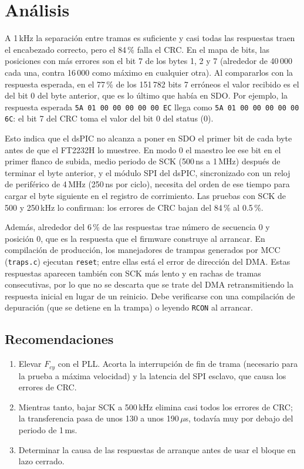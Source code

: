 \section{Análisis}

A 1\,kHz la separación entre tramas es suficiente y casi todas las respuestas
traen el encabezado correcto, pero el 84\,\% falla el CRC. En el mapa de
bits, las posiciones con más errores son el bit 7 de los bytes 1, 2 y 7
(alrededor de 40\,000 cada una, contra 16\,000 como máximo en cualquier otra). Al compararlos con la respuesta esperada, en el 77\,\% de los
151\,782 bits 7 erróneos el valor recibido es el del bit 0 del byte anterior,
que es lo último que había en SDO. Por ejemplo, la respuesta
esperada \texttt{5A 01 00 00 00 00 00 EC} llega como
\texttt{5A 01 00 00 00 00 00 6C}: el bit 7 del CRC toma el valor del bit 0
del status (0).

Esto indica que el dsPIC no alcanza a poner en SDO el primer bit de cada
byte antes de que el FT2232H lo muestree. En modo 0 el maestro lee ese bit
en el primer flanco de subida, medio periodo de SCK (500\,ns a 1\,MHz)
después de terminar el byte anterior, y el módulo SPI del dsPIC, sincronizado
con un reloj de periférico de 4\,MHz (250\,ns por ciclo), necesita del orden
de ese tiempo para cargar el byte siguiente en el registro de corrimiento.
Las pruebas con SCK de 500 y 250\,kHz lo confirman: los errores de CRC bajan
del 84\,\% al 0.5\,\%.

Además, alrededor del 6\,\% de las respuestas trae número de secuencia 0 y
posición 0, que es la respuesta que el firmware construye al arrancar. En
compilación de producción, los manejadores de trampas generados por MCC
(\texttt{traps.c}) ejecutan \texttt{reset}; entre ellas está el error de
dirección del DMA. Estas respuestas aparecen también con SCK más lento y en
rachas de tramas consecutivas, por lo que no se descarta que se trate del DMA
retransmitiendo la respuesta inicial en lugar de un reinicio. Debe
verificarse con una compilación de depuración (que se detiene en la trampa) o
leyendo \texttt{RCON} al arrancar.

\subsection*{Recomendaciones}

\begin{enumerate}
\item Elevar $F_{cy}$ con el PLL. Acorta la interrupción de fin de trama
  (necesario para la prueba a máxima velocidad) y la latencia del SPI
  esclavo, que causa los errores de CRC.
\item Mientras tanto, bajar SCK a 500\,kHz elimina casi todos los errores de
  CRC; la transferencia pasa de unos 130 a unos 190\,$\mu$s, todavía muy por
  debajo del periodo de 1\,ms.
\item Determinar la causa de las respuestas de arranque antes de usar el
  bloque en lazo cerrado.
\end{enumerate}
